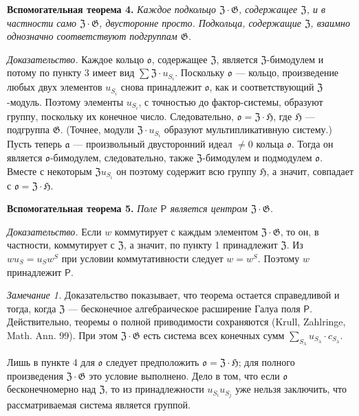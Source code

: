 \documentclass[11pt]{article}
\begin{document}
\noindent\textbf{Вспомогательная теорема 4.} \emph{Каждое подкольцо \(\mathfrak Z\cdot\mathfrak G\), содержащее \(\mathfrak Z\), и в частности само \(\mathfrak Z\cdot\mathfrak G\), двусторонне просто. Подкольца, содержащие \(\mathfrak Z\), взаимно однозначно соответствуют подгруппам \(\mathfrak G\).}

\noindent\emph{Доказательство.} Каждое кольцо \(\mathfrak o\), содержащее \(\mathfrak Z\), является \(\mathfrak Z\)-бимодулем и потому по пункту 3 имеет вид \(\sum\mathfrak Z\cdot u_{S_i}\). Поскольку \(\mathfrak o\) --- кольцо, произведение любых двух элементов \(u_{S_i}\) снова принадлежит \(\mathfrak o\), как и соответствующий \(\mathfrak Z\)-модуль. Поэтому элементы \(u_{S_i}\), с точностью до фактор-системы, образуют группу, поскольку их конечное число. Следовательно, \(\mathfrak o=\mathfrak Z\cdot\mathfrak H\), где \(\mathfrak H\) --- подгруппа \(\mathfrak G\). (Точнее, модули \(\mathfrak Z\cdot u_{S_i}\) образуют мультипликативную систему.) Пусть теперь \(\mathfrak a\) --- произвольный двусторонний идеал \(\neq0\) кольца \(\mathfrak o\). Тогда он является \(\mathfrak o\)-бимодулем, следовательно, также \(\mathfrak Z\)-бимодулем и подмодулем \(\mathfrak o\). Вместе с некоторым \(\mathfrak Zu_{S_i}\) он поэтому содержит всю группу \(\mathfrak H\), а значит, совпадает с \(\mathfrak o=\mathfrak Z\cdot\mathfrak H\).

\noindent\textbf{Вспомогательная теорема 5.} \emph{Поле \(\mathsf{P}\) является центром \(\mathfrak Z\cdot\mathfrak G\).}

\noindent\emph{Доказательство.} Если \(w\) коммутирует с каждым элементом \(\mathfrak Z\cdot\mathfrak G\), то он, в частности, коммутирует с \(\mathfrak Z\), а значит, по пункту 1 принадлежит \(\mathfrak Z\). Из \(wu_S=u_Sw^S\) при условии коммутативности следует \(w=w^S\). Поэтому \(w\) принадлежит \(\mathsf{P}\).

\noindent\emph{Замечание 1.} Доказательство показывает, что теорема остается справедливой и тогда, когда \(\mathfrak Z\) --- бесконечное алгебраическое расширение Галуа поля \(\mathsf{P}\). Действительно, теоремы о полной приводимости сохраняются (Krull, Zahlringe, Math. Ann. 99). При этом \(\mathfrak Z\cdot\mathfrak G\) есть система всех конечных сумм \(\sum_{S_\lambda}u_{S_\lambda}\cdot c_{S_\lambda}\).

Лишь в пункте 4 для \(\mathfrak o\) следует предположить \(\mathfrak o=\mathfrak Z\cdot\mathfrak H\); для полного произведения \(\mathfrak Z\cdot\mathfrak G\) это условие выполнено. Дело в том, что если \(\mathfrak o\) бесконечномерно над \(\mathfrak Z\), то из принадлежности \(u_{S_i}u_{S_j}\) уже нельзя заключить, что рассматриваемая система является группой.
\end{document}
